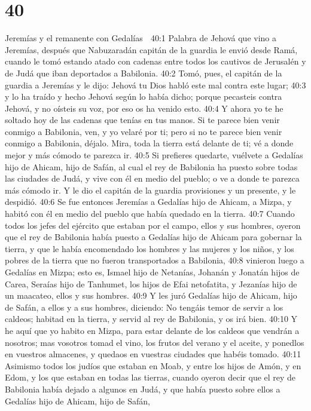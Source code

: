 \chapter{40}

Jeremías y el remanente con Gedalías  

40:1 Palabra de Jehová que vino a Jeremías, después que Nabuzaradán capitán de la guardia le envió desde Ramá, cuando le tomó estando atado con cadenas entre todos los cautivos de Jerusalén y de Judá que iban deportados a Babilonia.  
40:2 Tomó, pues, el capitán de la guardia a Jeremías y le dijo: Jehová tu Dios habló este mal contra este lugar;  
40:3 y lo ha traído y hecho Jehová según lo había dicho; porque pecasteis contra Jehová, y no oísteis su voz, por eso os ha venido esto.  
40:4 Y ahora yo te he soltado hoy de las cadenas que tenías en tus manos. Si te parece bien venir conmigo a Babilonia, ven, y yo velaré por ti; pero si no te parece bien venir conmigo a Babilonia, déjalo. Mira, toda la tierra está delante de ti; vé a donde mejor y más cómodo te parezca ir.  
40:5 Si prefieres quedarte, vuélvete a Gedalías hijo de Ahicam, hijo de Safán, al cual el rey de Babilonia ha puesto sobre todas las ciudades de Judá, y vive con él en medio del pueblo; o ve a donde te parezca más cómodo ir. Y le dio el capitán de la guardia provisiones y un presente, y le despidió.  
40:6 Se fue entonces Jeremías a Gedalías hijo de Ahicam, a Mizpa, y habitó con él en medio del pueblo que había quedado en la tierra.  
40:7 Cuando todos los jefes del ejército que estaban por el campo, ellos y sus hombres, oyeron que el rey de Babilonia había puesto a Gedalías hijo de Ahicam para gobernar la tierra, y que le había encomendado los hombres y las mujeres y los niños, y los pobres de la tierra que no fueron transportados a Babilonia,  
40:8 vinieron luego a Gedalías en Mizpa; esto es, Ismael hijo de Netanías, Johanán y Jonatán hijos de Carea, Seraías hijo de Tanhumet, los hijos de Efai netofatita, y Jezanías hijo de un maacateo, ellos y sus hombres.  
40:9 Y les juró Gedalías hijo de Ahicam, hijo de Safán, a ellos y a sus hombres, diciendo: No tengáis temor de servir a los caldeos; habitad en la tierra, y servid al rey de Babilonia, y os irá bien. 
40:10 Y he aquí que yo habito en Mizpa, para estar delante de los caldeos que vendrán a nosotros; mas vosotros tomad el vino, los frutos del verano y el aceite, y ponedlos en vuestros almacenes, y quedaos en vuestras ciudades que habéis tomado.  
40:11 Asimismo todos los judíos que estaban en Moab, y entre los hijos de Amón, y en Edom, y los que estaban en todas las tierras, cuando oyeron decir que el rey de Babilonia había dejado a algunos en Judá, y que había puesto sobre ellos a Gedalías hijo de Ahicam, hijo de Safán,  
